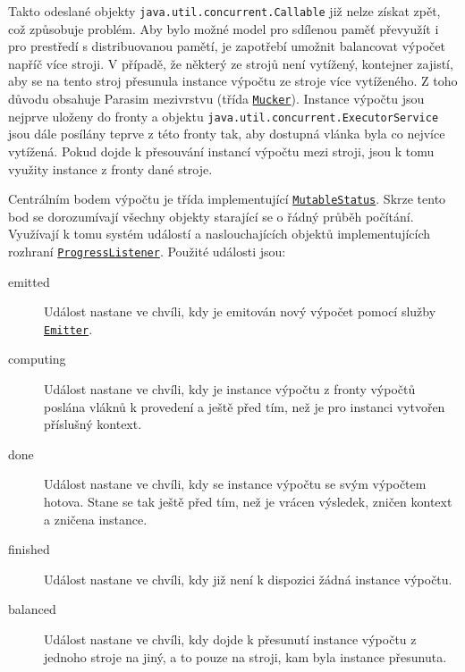 Takto odeslané objekty \texttt{java.util.concurrent.Callable} již nelze získat zpět,
což způsobuje problém. Aby bylo možné model pro sdílenou paměť převyužít i pro prestředí s distribuovanou pamětí,
je zapotřebí u\-mož\-nit balancovat výpočet napříč více stroji. V případě, že některý ze strojů není vytížený, kontejner zajistí,
aby se na tento stroj přesunula instance výpočtu ze stroje více vytíženého. Z toho důvodu
obsahuje Parasim mezivrstvu (třída \href{https://github.com/sybila/parasim/blob/master/extensions/computation-lifecycle-impl/src/main/java/org/sybila/parasim/computation/lifecycle/impl/common/Mucker.java}{\texttt{Mucker}}). Instance výpočtu jsou nejprve uloženy do fronty a objektu \texttt{java.util.concurrent.ExecutorService} jsou dále posílány teprve z této fronty 
 tak, aby dostupná vlánka byla co nejvíce vytížená.
Pokud dojde k přesouvání instancí výpočtu mezi stroji, jsou k tomu využity instance z fronty dané stroje.

Centrálním bodem výpočtu je třída implementující \href{https://github.com/sybila/parasim/blob/master/extensions/computation-lifecycle-api/src/main/java/org/sybila/parasim/computation/lifecycle/api/MutableStatus.java}{\texttt{MutableStatus}}. Skrze tento bod se dorozumívají všechny objekty
starající se o řádný průběh počítání. Využívají k tomu systém událostí a naslouchajících objektů
implementujících rozhraní \href{https://github.com/sybila/parasim/blob/master/extensions/computation-lifecycle-api/src/main/java/org/sybila/parasim/computation/lifecycle/api/ProgressListener.java}{\texttt{ProgressListener}}. Použité události jsou:

\begin{description}

    \item[emitted] 		Událost nastane ve chvíli, kdy je emitován nový výpočet pomocí služby
						\href{https://github.com/sybila/parasim/blob/master/extensions/computation-lifecycle-api/src/main/java/org/sybila/parasim/computation/lifecycle/api/Emitter.java}{\texttt{Emitter}}.

    \item[computing] 	Událost nastane ve chvíli, kdy je instance výpočtu z fronty vý\-poč\-tů poslána
						vláknů k provedení a ještě před tím, než je pro instanci vytvořen příslušný kontext.

    \item[done] 		Událost nastane ve chvíli, kdy se instance výpočtu se svým výpočtem
						hotova. Stane se tak ještě před tím, než je vrácen výsledek,
						zničen kontext a zničena instance.

	\item[finished]		Událost nastane ve chvíli, kdy již není k dispozici žádná instance výpočtu.
	
	\item[balanced]		Událost nastane ve chvíli, kdy dojde k přesunutí instance výpočtu z jednoho stroje na jiný,
						a to pouze na stroji, kam byla instance pře\-su\-nu\-ta.
\end{description}

